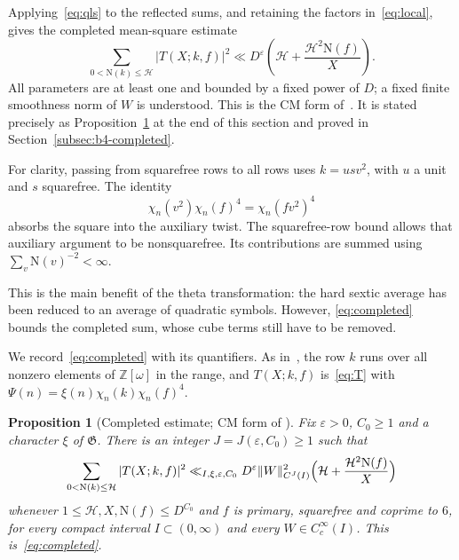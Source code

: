 \documentclass[11pt]{article}
\numberwithin{equation}{section}
\newcommand{\OO}{\mathbb Z[\omega]}
\newcommand{\N}{\mathrm N}
\newtheorem{proposition}{Proposition}
\begin{document}
Applying~\eqref{eq:qls} to the reflected sums, and retaining the factors
in~\eqref{eq:local}, gives the completed mean-square estimate
\begin{equation}\label{eq:completed}
 \boxed{\quad
 \sum_{0<\N(k)\le\mathcal H}|T(X;k,f)|^2
 \ll D^\varepsilon\left(\mathcal H+
                   \frac{\mathcal H^2\N(f)}X\right).
 \quad}
\end{equation}
All parameters are at least one and bounded by a fixed power of $D$;
a fixed finite smoothness norm of $W$ is understood. This is the CM form
of~\cite[Proposition~5.2]{OAI1112}. It is stated precisely as
Proposition~\ref{prop:r2-completed} at the end of this section and proved in
Section~\ref{subsec:b4-completed}.

For clarity, passing from squarefree rows to all rows uses
$k=u s v^2$, with $u$ a unit and $s$ squarefree. The identity
\begin{equation}\label{eq:d055}
 \chi_n(v^2)\chi_n(f)^4=\chi_n(fv^2)^4
\end{equation}
absorbs the square into the auxiliary twist. The squarefree-row bound
allows that auxiliary argument to be nonsquarefree. Its contributions
are summed using $\sum_{v}\N(v)^{-2}<\infty$.

This is the main benefit of the theta transformation: the hard sextic
average has been reduced to an average of quadratic symbols. However,
\eqref{eq:completed} bounds the completed sum, whose cube terms still
have to be removed.


We record~\eqref{eq:completed} with its quantifiers. As in~\cite[Proposition~5.2]{OAI1112}, the row $k$
runs over all nonzero elements of $\OO$ in the range, and $T(X;k,f)$ is~\eqref{eq:T} with
$\Psi(n)=\xi(n)\chi_n(k)\chi_n(f)^4$.

\begin{proposition}[Completed estimate; CM form of {\cite[Proposition~5.2]{OAI1112}}]\label{prop:r2-completed}
Fix $\varepsilon>0$, $C_0\ge1$ and a character $\xi$ of $\mathfrak G$. There is an integer
$J=J(\varepsilon,C_0)\ge1$ such that
\begin{equation}\label{eq:d056}
 \sum_{0<\N(k)\le\mathcal H}|T(X;k,f)|^2
 \ll_{I,\xi,\varepsilon,C_0}D^\varepsilon\|W\|_{C^J(I)}^2
 \Bigl(\mathcal H+\frac{\mathcal H^2\N(f)}X\Bigr)
\end{equation}
whenever $1\le\mathcal H,X,\N(f)\le D^{C_0}$ and $f$ is primary, squarefree and coprime to $6$, for every
compact interval $I\subset(0,\infty)$ and every $W\in C_c^\infty(I)$. This is~\eqref{eq:completed}.
\end{proposition}
\end{document}
